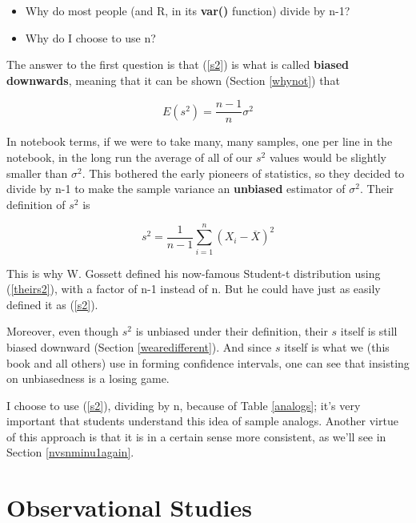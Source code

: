 \begin{itemize}

\item Why do most people (and R, in its {\bf var()} function) divide by
n-1?

\item Why do I choose to use n?

\end{itemize}

The answer to the first question is that (\ref{s2}) is what is called
{\bf biased downwards}, meaning that it can be shown (Section
\ref{whynot}) that 

\begin{equation}
E(s^2) = \frac{n-1}{n} \sigma^2
\end{equation}

In notebook terms, if we were to take many, many samples, one per line
in the notebook, in the long run the average of all of our $s^2$ values
would be slightly smaller than $\sigma^2$.  This bothered the early
pioneers of statistics, so they decided to divide by n-1 to make the
sample variance an {\bf unbiased} estimator of $\sigma^2$.  Their
definition of $s^2$ is

\begin{equation}
\label{theirs2}
s^2 = \frac{1}{n-1} \sum_{i=1}^{n} (X_i-\overline{X})^2 
\end{equation}

This is why W. Gossett defined his now-famous Student-t distribution using
(\ref{theirs2}), with a factor of n-1 instead of n.  But he could have
just as easily defined it as (\ref{s2}).

Moreover, even though $s^2$ is unbiased under their definition, their $s$
itself is still biased downward (Section \ref{wearedifferent}).  And
since $s$ itself is what we (this book and all others) use in forming
confidence intervals, one can see that insisting on unbiasedness is a
losing game.

I choose to use (\ref{s2}), dividing by n, because of Table
\ref{analogs}; it's very important that students understand this idea of
sample analogs.  Another virtue of this approach is that it is in a
certain sense more consistent, as we'll see in Section
\ref{nvsnminu1again}.

\section{Observational Studies}
\label{observational}

